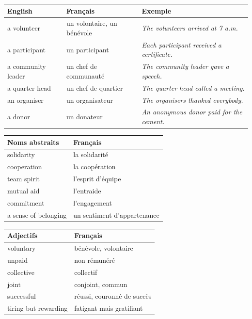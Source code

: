 \documentclass[11pt]{article}
\newcommand{\eng}[1]{\ifmmode\text{\textit{#1}}\else\begingroup\selectlanguage{english}\itshape #1\endgroup\fi}
\begin{document}
\begin{center}
\begin{tabularx}{\linewidth}{|X|X|X|}\hline
\rowcolor{popblueL} \textbf{English} & \textbf{Français} & \textbf{Exemple} \\ \hline
a volunteer & un volontaire, un bénévole & \eng{The volunteers arrived at 7 a.m.} \\ \hline
a participant & un participant & \eng{Each participant received a certificate.} \\ \hline
a community leader & un chef de communauté & \eng{The community leader gave a speech.} \\ \hline
a quarter head & un chef de quartier & \eng{The quarter head called a meeting.} \\ \hline
an organiser & un organisateur & \eng{The organisers thanked everybody.} \\ \hline
a donor & un donateur & \eng{An anonymous donor paid for the cement.} \\ \hline
\end{tabularx}
\end{center}

\begin{center}
\begin{tabularx}{\linewidth}{|X|X|}\hline
\rowcolor{popgreenL} \textbf{Noms abstraits} & \textbf{Français} \\ \hline
solidarity & la solidarité \\ \hline
cooperation & la coopération \\ \hline
team spirit & l'esprit d'équipe \\ \hline
mutual aid & l'entraide \\ \hline
commitment & l'engagement \\ \hline
a sense of belonging & un sentiment d'appartenance \\ \hline
\end{tabularx}
\end{center}

\begin{center}
\begin{tabularx}{\linewidth}{|X|X|}\hline
\rowcolor{popgoldL} \textbf{Adjectifs} & \textbf{Français} \\ \hline
voluntary & bénévole, volontaire \\ \hline
unpaid & non rémunéré \\ \hline
collective & collectif \\ \hline
joint & conjoint, commun \\ \hline
successful & réussi, couronné de succès \\ \hline
tiring but rewarding & fatigant mais gratifiant \\ \hline
\end{tabularx}
\end{center}
\end{document}
